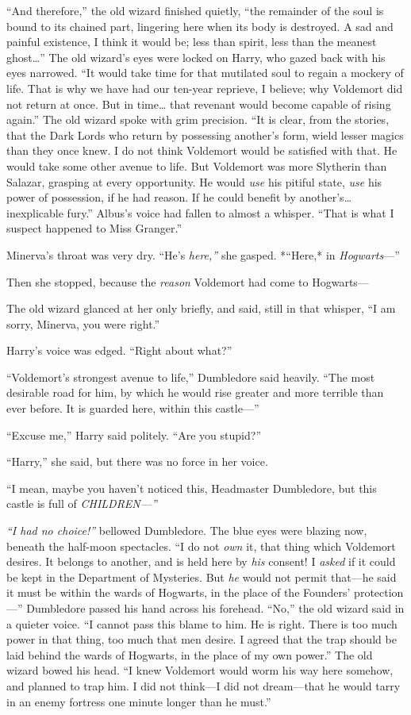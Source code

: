 ``And therefore,'' the old wizard finished quietly, ``the remainder of
the soul is bound to its chained part, lingering here when its body is
destroyed. A sad and painful existence, I think it would be; less than
spirit, less than the meanest ghost\ldots{}'' The old wizard's eyes were
locked on Harry, who gazed back with his eyes narrowed. ``It would take
time for that mutilated soul to regain a mockery of life. That is why we
have had our ten-year reprieve, I believe; why Voldemort did not return
at once. But in time\ldots{} that revenant would become capable of
rising again.'' The old wizard spoke with grim precision. ``It is clear,
from the stories, that the Dark Lords who return by possessing another's
form, wield lesser magics than they once knew. I do not think Voldemort
would be satisfied with that. He would take some other avenue to life.
But Voldemort was more Slytherin than Salazar, grasping at every
opportunity. He would \emph{use} his pitiful state, \emph{use} his power
of possession, if he had reason. If he could benefit by
another's\ldots{} inexplicable fury.'' Albus's voice had fallen to
almost a whisper. ``That is what I suspect happened to Miss Granger.''

Minerva's throat was very dry. ``He's \emph{here,''} she gasped.
*``Here,* in \emph{Hogwarts}---''

Then she stopped, because the \emph{reason} Voldemort had come to
Hogwarts---

The old wizard glanced at her only briefly, and said, still in that
whisper, ``I am sorry, Minerva, you were right.''

Harry's voice was edged. ``Right about what?''

``Voldemort's strongest avenue to life,'' Dumbledore said heavily. ``The
most desirable road for him, by which he would rise greater and more
terrible than ever before. It is guarded here, within this castle---''

``Excuse me,'' Harry said politely. ``Are you stupid?''

``Harry,'' she said, but there was no force in her voice.

``I mean, maybe you haven't noticed this, Headmaster Dumbledore, but
this castle is full of \emph{CHILDREN---''}

\emph{``I had no choice!''} bellowed Dumbledore. The blue eyes were
blazing now, beneath the half-moon spectacles. ``I do not \emph{own} it,
that thing which Voldemort desires. It belongs to another, and is held
here by \emph{his} consent! I \emph{asked} if it could be kept in the
Department of Mysteries. But \emph{he} would not permit that---he said
it must be within the wards of Hogwarts, in the place of the Founders'
protection---'' Dumbledore passed his hand across his forehead. ``No,''
the old wizard said in a quieter voice. ``I cannot pass this blame to
him. He is right. There is too much power in that thing, too much that
men desire. I agreed that the trap should be laid behind the wards of
Hogwarts, in the place of my own power.'' The old wizard bowed his head.
``I knew Voldemort would worm his way here somehow, and planned to trap
him. I did not think---I did not dream---that he would tarry in an enemy
fortress one minute longer than he must.''

